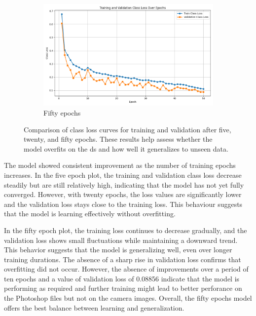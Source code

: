 \begin{figure}[!ht]
    \vskip 0.5cm
    \begin{subfigure}[b]{0.65\textwidth}
        \centering
        \includegraphics[width=\textwidth]{Figures/Results/Graphs/50_Epochs/class_loss_plot.png}
        \caption{Fifty epochs}
        \label{fig:50_E}
    \end{subfigure}
    
    \caption{Comparison of class loss curves for training and validation after five, twenty, and fifty epochs. These results help assess whether the model overfits on the \gls{ds} and how well it generalizes to unseen data.}
    \label{fig:E_Comparison}
\end{figure}

The model showed consistent improvement as the number of training epochs increases. In the five epoch plot, the training and validation class loss decrease steadily but are still relatively high, indicating that the model has not yet fully converged. However, with twenty epochs, the loss values are significantly lower and the validation loss stays close to the training loss. This behaviour suggests that the model is learning effectively without overfitting.

In the fifty epoch plot, the training loss continues to decrease gradually, and the validation loss shows small fluctuations while maintaining a downward trend. This behavior suggests that the model is generalizing well, even over longer training durations. The absence of a sharp rise in validation loss confirms that overfitting did not occur. However, the absence of improvements over a period of ten epochs and a value of validation loss of 0.08856 indicate that the model is performing as required and further training might lead to better perforance on the Photoshop files but not on the camera images. Overall, the fifty epochs model offers the best balance between learning and generalization.

